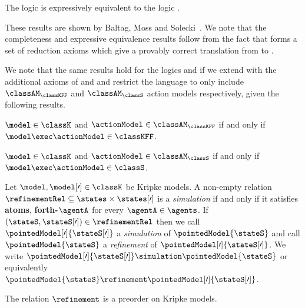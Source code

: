 \documentclass[twoside]{aiml14}
\begin{document}
  \begin{proposition}\label{aml-k-expressive-equivalence}
      The logic \logicAmlK{} is expressively equivalent to the logic \logicK{}.
  \end{proposition}

  These results are shown by Baltag, Moss and Solecki~\cite{baltag1998,baltag2005}. 
  We note that the completeness and expressive equivalence results follow from
  the fact that \axiomAmlK{} forms a set of reduction axioms which give a
  provably correct translation from \langAml{} to \lang{}.

  We note that the same results hold for the logics \logicAmlKFF{} and
  \logicAmlS{} if we extend \axiomAmlK{} with the additional axioms of
  \axiomKFF{} and \axiomS{} and restrict the language to only include
  $\classAM_\classKFF$ and $\classAM_\classS$ action models respectively, given
  the following results.

  \begin{proposition}\label{aml-kff-domain}
      $\model \in \classK$ and $\actionModel \in \classAM_\classKFF$ if and only if $\model \exec \actionModel \in \classKFF$.
  \end{proposition}

  \begin{proposition}\label{aml-s-domain}
      $\model \in \classK$ and $\actionModel \in \classAM_\classS$ if and only if $\model \exec \actionModel \in \classS$.
  \end{proposition}
  
  \begin{definition}\label{refinements}
      Let $\model, \model[\prime] \in \classK$ be Kripke models.
      A non-empty relation $\refinementRel \subseteq \states \times \states[\prime]$
      is a {\em simulation} if and only if it satisfies {\bf atoms}, {\bf forth-$\agentA$} for every $\agentA \in \agents$.
      If $(\stateS, \stateS[\prime]) \in \refinementRel$ then we call $\pointedModel[\prime]{\stateS[\prime]}$ a {\em simulation} of $\pointedModel{\stateS}$
      and call $\pointedModel{\stateS}$ a {\em refinement} of $\pointedModel[\prime]{\stateS[\prime]}$.
      We write $\pointedModel[\prime]{\stateS[\prime]} \simulation \pointedModel{\stateS}$
      or equivalently $\pointedModel{\stateS} \refinement \pointedModel[\prime]{\stateS[\prime]}$.
  \end{definition}

  \begin{proposition}
      The relation $\refinement$ is a preorder on Kripke models.
  \end{proposition}
\end{document}
